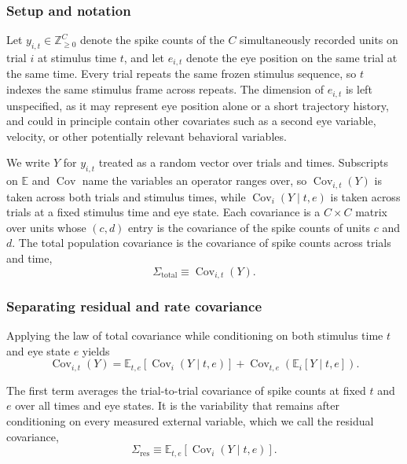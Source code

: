 \documentclass{lite}
\newcommand{\E}{\mathbb{E}}
\renewcommand{\C}{\operatorname{Cov}}
\begin{document}
\subsubsection{Setup and notation}

Let $y_{i,t} \in \mathbb{Z}_{\geq 0}^{C}$ denote the spike counts of the $C$ simultaneously recorded units on trial $i$ at stimulus time $t$, and let $e_{i,t}$ denote the eye position on the same trial at the same time. Every trial repeats the same frozen stimulus sequence, so $t$ indexes the same stimulus frame across repeats. The dimension of $e_{i,t}$ is left unspecified, as it may represent eye position alone or a short trajectory history, and could in principle contain other covariates such as a second eye variable, velocity, or other potentially relevant behavioral variables.

We write $Y$ for $y_{i,t}$ treated as a random vector over trials and times. Subscripts on $\E$ and $\C$ name the variables an operator ranges over, so $\C_{i,t}(Y)$ is taken across both trials and stimulus times, while $\C_{i}(Y \mid t,e)$ is taken across trials at a fixed stimulus time and eye state. Each covariance is a $C \times C$ matrix over units whose $(c,d)$ entry is the covariance of the spike counts of units $c$ and $d$. The total population covariance is the covariance of spike counts across trials and time,
\begin{equation}
\Sigma_{\text{total}} \equiv \C_{i,t}(Y).
\end{equation}

\subsubsection{Separating residual and rate covariance}

Applying the law of total covariance while conditioning on both stimulus time $t$ and eye state $e$ yields
\begin{equation}
\C_{i,t}(Y)
= \E_{t,e}\!\left[ \C_{i}(Y \mid t,e) \right]
+ \C_{t,e}\!\left( \E_{i}[Y \mid t,e] \right).
\end{equation}

The first term averages the trial-to-trial covariance of spike counts at fixed $t$ and $e$ over all times and eye states. It is the variability that remains after conditioning on every measured external variable, which we call the residual covariance,
\begin{equation}
\Sigma_{\text{res}} \equiv \E_{t,e}\!\left[ \C_{i}(Y \mid t,e) \right].
\end{equation}
\end{document}
